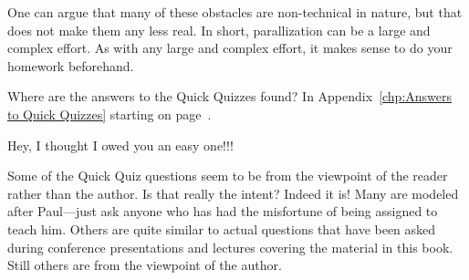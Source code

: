 	One can argue that many of these obstacles are non-technical
	in nature, but that does not make them any less real.
	In short, parallization can be a large and complex effort.
	As with any large and complex effort, it makes sense to
	do your homework beforehand.

\QuickQ{}
	Where are the answers to the Quick Quizzes found?
\QuickA{}
	In Appendix~\ref{chp:Answers to Quick Quizzes} starting on
	page~\pageref{chp:Answers to Quick Quizzes}.

	Hey, I thought I owed you an easy one!!!

\QuickQ{}
	Some of the Quick Quiz questions seem to be from the viewpoint
	of the reader rather than the author.
	Is that really the intent?
\QuickA{}
	Indeed it is!
	Many are modeled after Paul---just ask anyone who has had the
	misfortune of being assigned to teach him.
	Others are quite similar to actual questions that have been asked
	during conference presentations and lectures covering the
	material in this book.
	Still others are from the viewpoint of the author.


